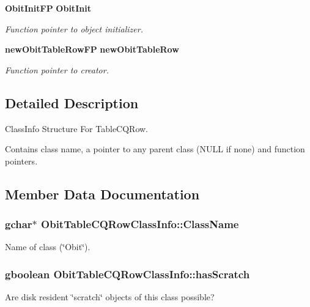 \begin{CompactItemize}
{\bf Obit\-Init\-FP} {\bf Obit\-Init}
\begin{CompactList}\small\item\em Function pointer to object initializer. \item\end{CompactList}\item 
{\bf new\-Obit\-Table\-Row\-FP} {\bf new\-Obit\-Table\-Row}
\begin{CompactList}\small\item\em Function pointer to creator. \item\end{CompactList}\end{CompactItemize}


\subsection{Detailed Description}
Class\-Info Structure For Table\-CQRow. 

Contains class name, a pointer to any parent class (NULL if none) and function pointers. 



\subsection{Member Data Documentation}
\subsubsection{\setlength{\rightskip}{0pt plus 5cm}gchar$\ast$ {\bf Obit\-Table\-CQRow\-Class\-Info::Class\-Name}}\label{structObitTableCQRowClassInfo_o2}


Name of class (\char`\"{}Obit\char`\"{}). 

\subsubsection{\setlength{\rightskip}{0pt plus 5cm}gboolean {\bf Obit\-Table\-CQRow\-Class\-Info::has\-Scratch}}\label{structObitTableCQRowClassInfo_o1}


Are disk resident \char`\"{}scratch\char`\"{} objects of this class possible? 

